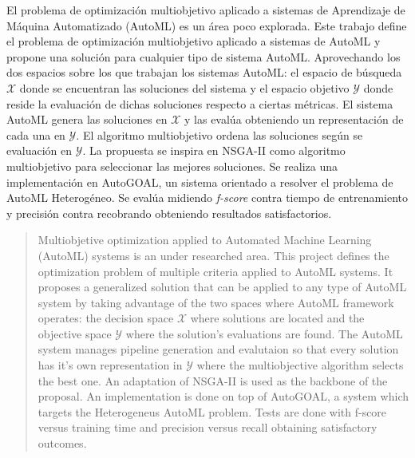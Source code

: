 \begin{resumen}
	El problema de optimizaci\'on multiobjetivo aplicado a sistemas de Aprendizaje de M\'aquina Automatizado (AutoML) es un \'area poco explorada. Este trabajo define el problema de optimizaci\'on multiobjetivo aplicado a sistemas de AutoML y propone una soluci\'on para cualquier tipo de sistema AutoML.
    Aprovechando los dos espacios sobre los que trabajan los sistemas AutoML: el espacio de b\'usqueda $\mathcal{X}$ donde se encuentran las soluciones del sistema y el espacio objetivo $\mathcal{Y}$ donde reside la evaluaci\'on de dichas soluciones respecto a ciertas m\'etricas. El sistema AutoML  genera las soluciones en $\mathcal{X}$ y las eval\'ua obteniendo un representaci\'on de cada una en $\mathcal{Y}$. El algoritmo multiobjetivo  ordena las soluciones seg\'un se evaluaci\'on en $\mathcal{Y}$.
    La propuesta se inspira en NSGA-II como algoritmo multiobjetivo para seleccionar las mejores soluciones. 
    Se realiza una implementaci\'on en AutoGOAL, un sistema orientado a resolver el problema de AutoML Heterog\'eneo.
    Se eval\'ua midiendo \textit{f-score} contra tiempo de entrenamiento y precisi\'on contra recobrando obteniendo resultados satisfactorios. 

\end{resumen}

\begin{abstract}
    Multiobjetive optimization applied to Automated Machine Learning (AutoML) systems is an under researched area. This project defines the optimization problem of multiple criteria applied to AutoML systems. It proposes a generalized solution that can be applied to any type of AutoML system by taking advantage of the two spaces where AutoML framework operates: the decision space $\mathcal{X}$ where solutions are located and the objective space $\mathcal{Y}$ where the solution's evaluations are found. The AutoML system manages pipeline generation and evalutaion so that every solution has it's own representation in $\mathcal{Y}$ where the multiobjective algorithm selects the best one. An adaptation of NSGA-II is used as the backbone of the proposal. An implementation is done on top of AutoGOAL, a system which targets the Heterogeneus AutoML problem. Tests are done with f-score versus training time and precision versus recall obtaining satisfactory outcomes.
\end{abstract}

